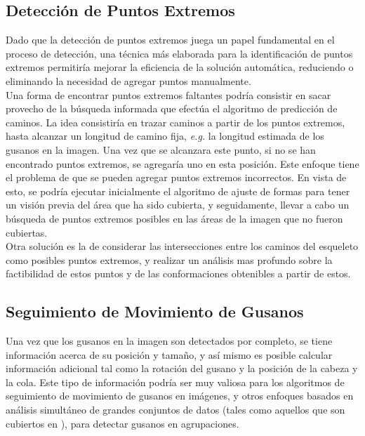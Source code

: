 \subsection*{Detecci\'on de Puntos Extremos}
Dado que la detecci\'on de puntos extremos juega un papel fundamental
en el proceso de detecci\'on, una t\'ecnica m\'as elaborada para la 
identificaci\'on de puntos extremos permitir\'ia mejorar la eficiencia de la
soluci\'on autom\'atica, reduciendo o eliminando la necesidad de agregar
puntos manualmente.\\

Una forma de encontrar puntos extremos faltantes podr\'ia consistir en sacar
provecho de la b\'usqueda informada que efect\'ua el algoritmo de predicci\'on
de caminos. La idea consistir\'ia en trazar caminos a partir de los puntos extremos,
hasta alcanzar un longitud de camino fija, \emph{e.g.} la longitud estimada
de los gusanos en la imagen. Una vez que se alcanzara este punto, si no se han
encontrado puntos extremos, se agregar\'ia uno en esta posici\'on. Este enfoque
tiene el problema de que se pueden agregar puntos extremos incorrectos. En vista
de esto, se podr\'ia ejecutar inicialmente el algoritmo de ajuste de formas para
tener un visi\'on previa del \'area que ha sido cubierta, y seguidamente, llevar
a cabo un b\'usqueda de puntos extremos posibles en las \'areas de la imagen
que no fueron cubiertas.\\

Otra soluci\'on es la de considerar las intersecciones entre los caminos
del esqueleto como posibles puntos extremos, y realizar un an\'alisis mas
profundo sobre la factibilidad de estos puntos y de las conformaciones 
obtenibles a partir de estos.

\subsection*{Seguimiento de Movimiento de Gusanos}
Una vez que los gusanos en la imagen son detectados por completo, se 
tiene informaci\'on acerca de su posici\'on y tama\~no, y as\'i mismo es
posible calcular informaci\'on adicional tal como la rotaci\'on del gusano y la
posici\'on de la cabeza y la cola. Este tipo de informaci\'on 
podr\'ia ser muy valiosa para los algoritmos de seguimiento de movimiento
de gusanos en im\'agenes, y otros enfoques basados en an\'alisis simult\'aneo
de grandes conjuntos de datos (tales como aquellos que son cubiertos en
\cite{automated}), para detectar gusanos en agrupaciones.


